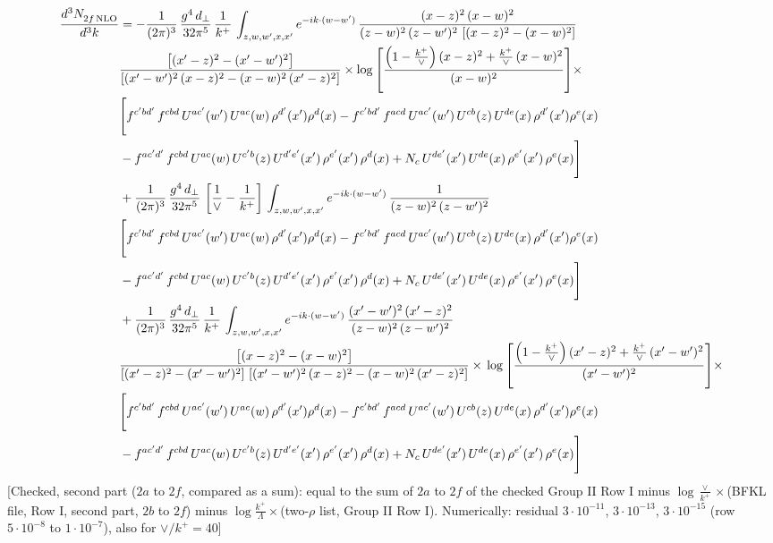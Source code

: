 \documentclass[9pt]{article}
\numberwithin{equation}{section}
\begin{document}
\begin{align}
    \frac{d^{3}N_{2f\,\rm NLO}^{\rm}}{d^{3}k}  & =   - \frac{1}{(2\pi)^{3}}\, \frac{g^{4}\,d_{\perp}}{32\pi^{5}}\,\frac{1}{k^{+}}\,\int_{z,w,w^{\prime},x,x'} e^{-ik\cdot (w-w')}\,\frac{(x-z)^{2}\, (x-w)^{2}}{(z-w)^{2}\, (z-w')^{2}\,\left[(x-z)^{2} - (x-w)^{2}\right]}\notag \\ & \frac{\left[(x'-z)^{2}-(x'-w')^{2}\right]}{\left[(x'-w')^{2}\, (x-z)^{2} - (x-w)^{2}\, (x'-z)^{2}\right]}\times \log{\left[\frac{\left(1-\frac{k^{+}}{\vee}\right)(x-z)^{2}+\frac{k^{+}}{\vee}\,(x-w)^{2}}{(x-w)^{2}}\right]}\times\notag \\ & \Bigg[f^{c'bd'}\,f^{cbd}\, U^{ac'}(w')\,U^{ac}(w)\,\rho^{d'}(x')\rho^{d}(x)- f^{c'bd'}\,f^{acd}\,U^{ac'}(w')\,U^{cb}(z)\,U^{de}(x)\,\rho^{d'}(x')\rho^{e}(x) \notag \\ & -f^{ac'd'}\,f^{cbd}\,U^{ac}(w)\,U^{c'b}(z)\,U^{d'e'}(x')\,\rho^{e'}(x')\,\rho^{d}(x) +N_{c}\,U^{de'}(x')\,U^{de}(x)\,\rho^{e'}(x')\,\rho^{e}(x)\Bigg]  \notag \\
& + \frac{1}{(2\pi)^{3}}\, \frac{g^{4}\,d_{\perp}}{32\pi^{5}}\,\left[\frac{1}{\vee} - \frac{1}{k^{+}}\right]\,\int_{z,w,w^{\prime},x,x'} e^{-ik\cdot (w-w')}\,\frac{1}{(z-w)^{2}\, (z-w')^{2}}\notag \\ & \Bigg[f^{c'bd'}\,f^{cbd}\, U^{ac'}(w')\,U^{ac}(w)\,\rho^{d'}(x')\rho^{d}(x)- f^{c'bd'}\,f^{acd}\,U^{ac'}(w')\,U^{cb}(z)\,U^{de}(x)\,\rho^{d'}(x')\rho^{e}(x) \notag \\ & -f^{ac'd'}\,f^{cbd}\,U^{ac}(w)\,U^{c'b}(z)\,U^{d'e'}(x')\,\rho^{e'}(x')\,\rho^{d}(x) +N_{c}\,U^{de'}(x')\,U^{de}(x)\,\rho^{e'}(x')\,\rho^{e}(x)\Bigg]  \notag \\
& + \frac{1}{(2\pi)^{3}}\, \frac{g^{4}\,d_{\perp}}{32\pi^{5}}\,\frac{1}{k^{+}}\,\int_{z,w,w^{\prime},x,x'} e^{-ik\cdot (w-w')}\,\frac{(x'-w')^{2}\, (x'-z)^{2}}{(z-w)^{2}\, (z-w')^{2}}\notag \\ & \frac{\left[(x-z)^{2} - (x-w)^{2}\right]}{\left[(x'-z)^{2} - (x'-w')^{2}\right]\, \left[(x'-w')^{2}\, (x - z)^{2} - (x-w)^{2}\,(x'-z)^{2}\right]}\times\, \log{\left[\frac{\left(1-\frac{k^{+}}{\vee}\right)(x'-z)^{2}+\frac{k^{+}}{\vee}\,(x'-w')^{2}}{(x'-w')^{2}}\right]}\times \notag \\ &  \Bigg[f^{c'bd'}\,f^{cbd}\, U^{ac'}(w')\,U^{ac}(w)\,\rho^{d'}(x')\rho^{d}(x)- f^{c'bd'}\,f^{acd}\,U^{ac'}(w')\,U^{cb}(z)\,U^{de}(x)\,\rho^{d'}(x')\rho^{e}(x) \notag \\ & -f^{ac'd'}\,f^{cbd}\,U^{ac}(w)\,U^{c'b}(z)\,U^{d'e'}(x')\,\rho^{e'}(x')\,\rho^{d}(x) +N_{c}\,U^{de'}(x')\,U^{de}(x)\,\rho^{e'}(x')\,\rho^{e}(x)\Bigg]
\end{align} {\color{red}[Checked, second part ($2a$ to $2f$, compared as a sum): equal to the sum of $2a$ to $2f$ of the checked Group II Row I minus $\log\frac{\vee}{k^{+}}\times$(BFKL file, Row I, second part, $2b$ to $2f$) minus $\log\frac{k^{+}}{\Lambda}\times$(two-$\rho$ list, Group II Row I). Numerically: residual $3\cdot10^{-11}$, $3\cdot10^{-13}$, $3\cdot10^{-15}$ (row $5\cdot10^{-8}$ to $1\cdot10^{-7}$), also for $\vee/k^{+}=40$]}\par\noindent
\end{document}
